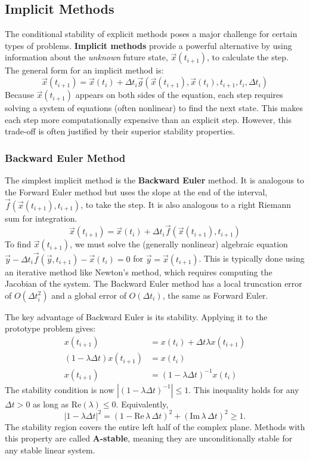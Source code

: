 \subsection{Implicit Methods}
\label{subsec:ivp-implicit}
The conditional stability of explicit methods poses a major challenge for certain types of problems. \textbf{Implicit methods} provide a powerful alternative by using information about the \textit{unknown} future state, $\vec{x}(t_{i+1})$, to calculate the step. The general form for an implicit method is:
\begin{equation}
    \vec{x}(t_{i+1}) = \vec{x}(t_i) + \Delta t_i \vec{g}(\vec{x}(t_{i+1}), \vec{x}(t_i), t_{i+1}, t_i, \Delta t_i)
\end{equation}
Because $\vec{x}(t_{i+1})$ appears on both sides of the equation, each step requires solving a system of equations (often nonlinear) to find the next state. This makes each step more computationally expensive than an explicit step. However, this trade-off is often justified by their superior stability properties.

\subsubsection{Backward Euler Method}
The simplest implicit method is the \textbf{Backward Euler} method. It is analogous to the Forward Euler method but uses the slope at the end of the interval, $\vec{f}(\vec{x}(t_{i+1}), t_{i+1})$, to take the step. It is also analogous to a right Riemann sum for integration.
\begin{equation}
    \vec{x}(t_{i+1}) = \vec{x}(t_i) + \Delta t_i \vec{f}(\vec{x}(t_{i+1}), t_{i+1})
    \label{eq:backward_euler}
\end{equation}
To find $\vec{x}(t_{i+1})$, we must solve the (generally nonlinear) algebraic equation $\vec{y} - \Delta t_i \vec{f}(\vec{y}, t_{i+1}) - \vec{x}(t_i) = 0$ for $\vec{y} = \vec{x}(t_{i+1})$. This is typically done using an iterative method like Newton's method, which requires computing the Jacobian of the system. The Backward Euler method has a local truncation error of $O(\Delta t_i^2)$ and a global error of $O(\Delta t_i)$, the same as Forward Euler.

The key advantage of Backward Euler is its stability. Applying it to the prototype problem gives:
\begin{align}
    x(t_{i+1}) &= x(t_i) + \Delta t \lambda x(t_{i+1}) \\
    (1 - \lambda \Delta t)x(t_{i+1}) &= x(t_i) \\
    x(t_{i+1}) &= (1 - \lambda \Delta t)^{-1} x(t_i)
\end{align}
The stability condition is now $|(1 - \lambda \Delta t)^{-1}| \le 1$. This inequality holds for any $\Delta t > 0$ as long as $\mathrm{Re}(\lambda) \le 0$. Equivalently,
\begin{equation}
    |1 - \lambda\Delta t|^2 = (1-\mathrm{Re}\,\lambda\,\Delta t)^2 + (\mathrm{Im}\,\lambda\,\Delta t)^2 \ge 1.
\end{equation}
The stability region covers the entire left half of the complex plane. Methods with this property are called \textbf{A-stable}, meaning they are unconditionally stable for any stable linear system.


